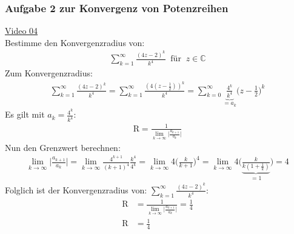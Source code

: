 \subsubsection{ Aufgabe 2 zur Konvergenz von Potenzreihen}
\href{https://youtu.be/8TeaUxqFeuk}{Video 04}\\
Bestimme den Konvergenzradius von:\\
\begin{align*}
	\sum\limits_{k=1}^{\infty}\frac{(4z-2)^k}{k^4}\;\;\text{für}\;\;z\in \mathbb{C}
\end{align*}
Zum Konvergenzradius:\\
\begin{align*}
	\sum\limits_{k=1}^{\infty}\frac{(4z-2)^k}{k^4}=\sum\limits_{k=1}^{\infty}\frac{(4(z-\frac{1}{2}))^k}{k^4}=\sum\limits_{k=0}^{\infty}\underbrace {\frac{4^k}{k^4}}_{=a_k}\bigg(z-\frac{1}{2}\bigg)^k
\end{align*}
Es gilt mit $ a_k=\frac{4^k}{k^4} $:
\begin{align*}
	\mathrm{R}=\frac{1}{\lim\limits_ {k\to\infty}\big|\frac{a_{k+1}}{a_k}\big|}
\end{align*}
Nun den Grenzwert berechnen:\\
\begin{align*}
	\lim\limits_ {k\to\infty}\bigg|\frac{a_{k+1}}{a_k}\bigg|=\lim\limits_ {k\to\infty}\frac{4^{k+1}}{(k+1)^4}\frac{k^4}{4^k}=\lim\limits_ {k\to\infty}4\bigg(\frac{k}{k+1}\bigg)^4=\lim\limits_ {k\to\infty}4\bigg(\underbrace {\frac{k}{k(1+\frac{1}{k})}}_{=1}\bigg)=4
\end{align*}
Folglich ist der Konvergenzradius von: $\sum\limits_{k=1}^{\infty}\frac{(4z-2)^k}{k^4}  $:\\
\begin{align*}
	\mathrm{R}&=\frac{1}{\lim\limits_ {k\to\infty}\big|\frac{a_{k+1}}{a_k}\big|}=\frac{1}{4}\\
	\mathrm{R}&=\frac{1}{4}
\end{align*}
\newpage
\noindent
